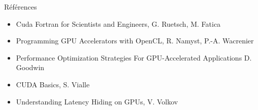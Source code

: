 \documentclass[11pt,mathserif]{beamer}
\newcommand{\Pdf}{\faFilePdfO}
\newcommand{\liburu}{\faBook}
\begin{document}
\begin{frame}{Références}
\begin{itemize}[<+->]
  \item[\liburu] Cuda Fortran for Scientists and Engineers, G. Ruetsch, M. Fatica
  \item[\Pdf] Programming GPU Accelerators with OpenCL, R. Namyst, P.-A. Wacrenier \href{https://raymond-namyst.emi.u-bordeaux.fr/ens/pap/PAP-GPU.pdf}{}
  \item[\Pdf] Performance Optimization Strategies For GPU-Accelerated Applications D. Goodwin \href{https://on-demand.gputechconf.com/gtc/2013/presentations/S3046-Performance-Optimization-Strategies-for-GPU-Accelerated-Apps.pdf}{}
  \item[\faFilePowerpointO] CUDA Basics, S. Vialle \href{http://www.metz.supelec.fr/metz/personnel/vialle/course/PPS-5A-GPGPU/notes-de-cours-specifiques/PPS-GPU-02-CUDA-Basics-2spp.pdf}{}
  \item[\Pdf] Understanding Latency Hiding on GPUs, V. Volkov \href{http://www2.eecs.berkeley.edu/Pubs/TechRpts/2016/EECS-2016-143.pdf}{}
\end{itemize}
\end{frame}
\end{document}
